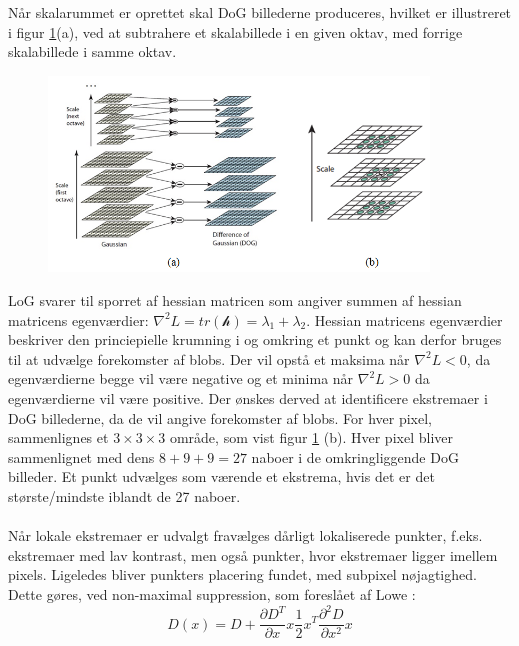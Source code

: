 Når skalarummet er oprettet skal DoG billederne produceres, hvilket er illustreret i figur \ref{fig:difference}(a), ved at subtrahere et skalabillede i en given oktav, med forrige skalabillede i samme oktav.
\begin{figure}[H]
    \centering
    \includegraphics[width=0.90\textwidth]{fig/30.png}
     \vspace{-1em}
    \begin{center}    
       \caption{\textcolor{gray}{\footnotesize \textit{ }}}
    \label{fig:difference}
     \end{center}
     \vspace{-2.5em}
  \end{figure} \noindent
LoG svarer til sporret af hessian matricen som angiver summen af hessian matricens egenværdier: $\nabla^2 L=tr(\mathcal{h})=\lambda_1+\lambda_2$. Hessian matricens egenværdier beskriver den princiepielle krumning i og omkring et punkt og kan derfor bruges til at udvælge forekomster af blobs. Der vil opstå et maksima når  $\nabla^2 L<0$, da egenværdierne begge vil være negative og et minima når $\nabla^2 L > 0$ da egenværdierne vil være positive. Der ønskes derved at identificere ekstremaer i DoG billederne, da de vil angive forekomster af blobs. For hver pixel, sammenlignes et $3\times3\times3$ område, som vist figur \ref{fig:difference} (b). Hver pixel bliver sammenlignet med dens $8+9+9=27$ naboer i de omkringliggende DoG billeder. Et punkt udvælges som værende et ekstrema, hvis det er det største/mindste iblandt de 27 naboer.
\\
\\
Når lokale ekstremaer er udvalgt fravælges dårligt lokaliserede punkter, f.eks. ekstremaer med lav kontrast, men også punkter, hvor ekstremaer ligger imellem pixels. Ligeledes bliver punkters placering fundet, med subpixel nøjagtighed. Dette gøres, ved non-maximal suppression, som foreslået af Lowe \cite{nonmaximalsuppression}:
\begin{equation}
D(x)=D+\dfrac{\partial D^T}{\partial x}x\dfrac{1}{2}x^T\dfrac{\partial^2D}{\partial x^2}x
\label{nonmax}
\end{equation}
